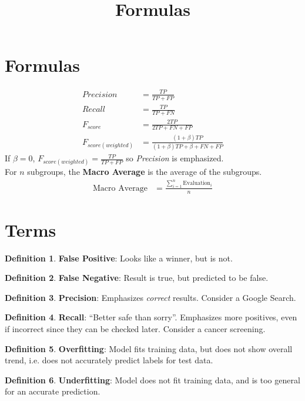 \documentclass{article}
\title{Formulas}
\numberwithin{pic}{section}
\numberwithin{lem}{section}
\numberwithin{thm}{section}
\numberwithin{cor}{section}
\theoremstyle{definition}
\numberwithin{ex}{section}
\newtheorem{defn}{Definition}
\numberwithin{defn}{section}
\theoremstyle{definition}
\theoremstyle{remark}
\newcommand{\Frac}[2]{\displaystyle \frac{#1}{#2}}
\begin{document}
\fancyhead[r]{\today}
\pagestyle{fancy}
\section{Formulas}
\begin{align}
  Precision &= \frac{TP}{TP + FP}\\
  Recall &= \frac{TP}{TP + FN}\\
  F_{score} &= \frac{2TP}{2TP + FN + FP}\\
  F_{score (weighted)} &= \frac{(1+\beta)TP}{(1+\beta)TP + \beta + FN + FP}
\end{align}
If $\beta = 0$, $F_{score (weighted)} = \Frac{TP}{TP + FP}$
so \textit{Precision} is emphasized.\\
For $n$ subgroups, the \textbf{Macro Average} is the average of the subgroups.
\begin{align}
  \text{Macro Average} &= \frac{\sum_{i=1}^n \text{Evaluation}_i}{n}
\end{align}
\section{Terms}
\begin{defn}
  \textbf{False Positive}: Looks like a winner, but is not.
\end{defn}

\begin{defn}
  \textbf{False Negative}: Result is true, but predicted to be false.
\end{defn}

\begin{defn}
  \textbf{Precision}: Emphasizes \textit{correct} results. Consider a Google Search.
\end{defn}

\begin{defn}
  \textbf{Recall}: ``Better safe than sorry''. Emphasizes more positives, even if incorrect since they can be checked later. Consider a cancer screening.
\end{defn}

\begin{defn}
  \textbf{Overfitting}: Model fits training data, but does not show overall trend, i.e. does not accurately predict labels for test data.
\end{defn}

\begin{defn}
  \textbf{Underfitting}: Model does not fit training data, and is too general for an accurate prediction.
\end{defn}
\end{document}
